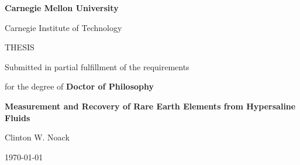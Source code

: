 
\thispagestyle{empty}
\begin{center}
\Huge{\textbf{Carnegie Mellon University}}

\LARGE{Carnegie Institute of Technology}
\vspace{1cm}

\Large{THESIS}

Submitted in partial fulfillment of the requirements

for the degree of \large{\textbf{Doctor of Philosophy}}

\vspace{1cm}

\Large{\textbf{Measurement and Recovery of Rare Earth Elements from Hypersaline Fluids}}

\Large{Clinton W. Noack}




\large{\today}
\end{center}

\clearpage
 

